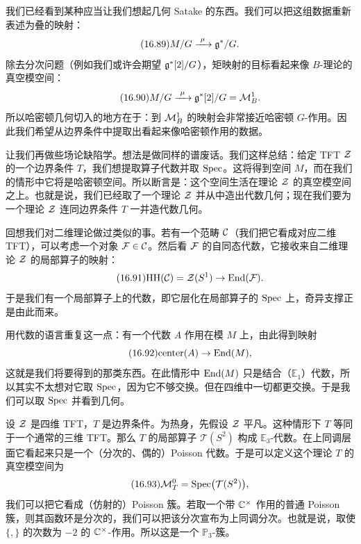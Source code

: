 我们已经看到某种应当让我们想起几何 Satake 的东西。我们可以把这组数据重新表述为叠的映射：
\begin{equation}\tag{16.89}
M/G\xrightarrow{\ \mu\ }\mathfrak{g}^*/G.
\end{equation}
除去分次问题（例如我们或许会期望 $\mathfrak{g}^*[2]/G$），矩映射的目标看起来像 $B$-理论的真空模空间：
\begin{equation}\tag{16.90}
M/G\xrightarrow{\ \mu\ }\mathfrak{g}^*[2]/G=\mathcal{M}^1_B.
\end{equation}
所以哈密顿几何切入的地方在于：到 $\mathcal{M}^1_B$ 的映射会非常接近哈密顿 $G$-作用。因此我们希望从边界条件中提取出看起来像哈密顿作用的数据。

让我们再做些场论缺陷学。想法是做同样的谱废话。我们这样总结：给定 TFT $\mathcal{Z}$ 的一个边界条件 $T$，我们想提取算子代数并取 $\mathrm{Spec}$。这将得到空间 $M$，而在我们的情形中它将是哈密顿空间。所以断言是：这个空间生活在理论 $\mathcal{Z}$ 的真空模空间之上。也就是说，我们已经取了一个理论 $\mathcal{Z}$ 并从中造出代数几何；现在我们要为一个理论 $\mathcal{Z}$ 连同边界条件 $T$ 一并造代数几何。

回想我们对二维理论做过类似的事。若有一个范畴 $\mathcal{C}$（我们把它看成对应二维 TFT），可以考虑一个对象 $\mathcal{F}\in\mathcal{C}$。然后看 $\mathcal{F}$ 的自同态代数，它接收来自二维理论 $\mathcal{Z}$ 的局部算子的映射：
\begin{equation}\tag{16.91}
\mathrm{HH}(\mathcal{C})=\mathcal{Z}(S^1)\to\mathrm{End}(\mathcal{F}).
\end{equation}
于是我们有一个局部算子上的代数，即它层化在局部算子的 $\mathrm{Spec}$ 上，奇异支撑正是由此而来。

用代数的语言重复这一点：有一个代数 $A$ 作用在模 $M$ 上，由此得到映射
\begin{equation}\tag{16.92}
\mathrm{center}(A)\to\mathrm{End}(M),
\end{equation}
这就是我们将要得到的那类东西。在此情形中 $\mathrm{End}(M)$ 只是结合（$\mathbb{E}_1$）代数，所以其实不太想对它取 $\mathrm{Spec}$，因为它不够交换。但在四维中一切都更交换。于是我们可以取 $\mathrm{Spec}$ 并看到几何。

设 $\mathcal{Z}$ 是四维 TFT，$T$ 是边界条件。为热身，先假设 $\mathcal{Z}$ 平凡。这种情形下 $T$ 等同于一个通常的三维 TFT。那么 $T$ 的局部算子 $\mathcal{T}(S^2)$ 构成 $\mathbb{E}_3$-代数。在上同调层面它看起来只是一个（分次的、偶的）Poisson 代数。于是可以定义这个理论 $T$ 的真空模空间为
\begin{equation}\tag{16.93}
\mathcal{M}^0_T=\mathrm{Spec}\bigl(\mathcal{T}(S^2)\bigr),
\end{equation}
我们可以把它看成（仿射的）Poisson 簇。若取一个带 $\mathbb{C}^\times$ 作用的普通 Poisson 簇，则其函数环是分次的，我们可以把该分次宣布为上同调分次。也就是说，取使 $\{,\}$ 的次数为 $-2$ 的 $\mathbb{C}^\times$-作用。所以这是一个 $\mathbb{P}_3$-簇。

